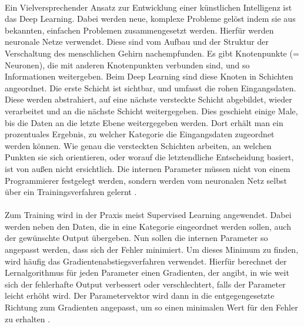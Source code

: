 \documentclass[12pt,a4paper,headinclude,twoside, plainheadsepline, open=right,numbers=noenddot]{scrreprt}
\begin{document}
\paragraph{}
Ein Vielversprechender Ansatz zur Entwicklung einer künstlichen Intelligenz ist das Deep Learning. Dabei werden neue, komplexe Probleme gelöst indem sie aus bekannten, einfachen Problemen zusammengesetzt werden. Hierfür werden neuronale Netze verwendet. Diese sind vom Aufbau und der Struktur der Verschaltung des menschlichen Gehirn nachempfunden. Es gibt Knotenpunkte (= Neuronen), die mit anderen Knotenpunkten verbunden sind, und so Informationen weitergeben. Beim Deep Learning sind diese Knoten in Schichten angeordnet. Die erste Schicht ist sichtbar, und umfasst die rohen Eingangsdaten. Diese werden abstrahiert, auf eine nächste versteckte Schicht abgebildet, wieder verarbeitet und an die nächste Schicht weitergegeben. Dies geschieht einige Male, bis die Daten an die letzte Ebene weitergegeben werden. Dort erhält man ein prozentuales Ergebnis, zu welcher Kategorie die Eingangsdaten zugeordnet werden können. Wie genau die versteckten Schichten arbeiten, an welchen Punkten sie sich orientieren, oder worauf die letztendliche Entscheidung basiert, ist von außen nicht ersichtlich. Die internen Parameter müssen nicht von einem Programmierer festgelegt werden, sondern werden vom neuronalen Netz selbst über ein Trainingsverfahren gelernt \cite{Goodfellow-et-al-2016}. 
\paragraph{}
Zum Training wird in der Praxis meist Supervised Learning angewendet. Dabei werden neben den Daten, die in eine Kategorie eingeordnet werden sollen, auch der gewünschte Output übergeben. Nun sollen die internen Parameter so angepasst werden, dass sich der Fehler minimiert. Um dieses Minimum zu finden, wird häufig das Gradientenabstiegsverfahren verwendet. Hierfür berechnet der Lernalgorithmus für jeden Parameter einen Gradienten, der angibt, in wie weit sich der fehlerhafte Output verbessert oder verschlechtert, falls der Parameter leicht erhöht wird. Der Parametervektor wird dann in die entgegengesetzte Richtung zum Gradienten angepasst, um so einen minimalen Wert für den Fehler zu erhalten \cite{LeCun2015DeepLearning}. 

\end{document}
